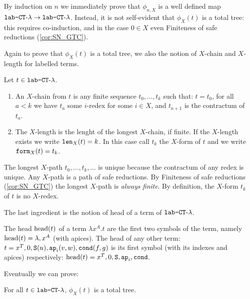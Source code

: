 By induction on $n$ we immediately prove that 
$\phi_{n,X}$ is a well defined map ${\mbox{\tt lab-}{ {\tt CT}\mbox{-}\lambda}} \rightarrow {\mbox{\tt lab-} { {\tt CT}\mbox{-}\lambda} }$.
Instead, it is not self-evident that $\phi_X(t)$ is a total tree: this requires co-induction,
and in the case $0 \in X$ even Finiteness of safe reductions (\ref{cor:SN_GTC}).



Again to prove that $\phi_X(t)$ is a total tree, 
we also the notion of $X$-chain and $X$-length for labelled terms.


\begin{definition}
Let  $t \in {\mbox{\tt lab-} { {\tt CT}\mbox{-}\lambda} }$.
\begin{enumerate}
\item
An $X$-chain from $t$ is any finite sequence $t_0, \ldots, t_k$ such that: 
$t=t_0$, for all $a<k$ we have $t_a$ some $i$-redex for some $ i \in X$, and $t_{a+1}$ is the contractum
of $t_a$. 
\item
The $X$-length is the lenght of the longest $X$-chain, if finite. 
If the $X$-length exists we write ${\tt len}_X(t) = k$. 
In this case call $t_k$ the $X$-form of $t$ and we
write ${\tt form}_X(t) = t_k$.
\end{enumerate}
\end{definition}

The longest $X$-path  $t_0, \ldots, t_k, \ldots$ is unique because the contractum of any redex is unique.
Any $X$-path is a path of safe reductions. 
By Finiteness of safe reductions (\ref{cor:SN_GTC}) the longest $X$-path is \emph{always finite}.
By definition, the $X$-form $t_k$ of $t$ is no $X$-redex.

The last ingredient is the notion of head of a term of ${\mbox{\tt lab-}{ {\tt CT}\mbox{-}\lambda}}$. 
\begin{definition}[Head]
The head ${\rm head}(t)$  of a term
$\lambda x^A.t$ are the first two symbols of the term, namely ${\rm head}(t) = \lambda, x^A$ (with apices). 
The head of any other term:
$t = x^T,0,{\tt S}(u),{\tt ap}_i(v,w),{\tt cond}(f,g)$ is its first symbol (with its indexes and apices) respectively: 
${\rm head}(t) = x^T, 0, {\tt S}, {\tt ap}_i, {\tt cond}$. 
\end{definition}

Eventually we can prove:

\begin{lemma}
For all $t \in {\mbox{\tt lab-} { {\tt CT}\mbox{-}\lambda} }$, $\phi_X(t)$ is a total tree.
\end{lemma}



